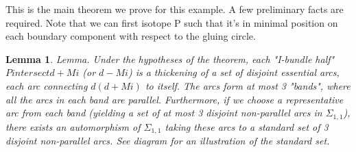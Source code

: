 \documentclass[12pt]{amsart}
\newtheorem{lemma}[theorem]{Lemma}
\theoremstyle{definition}
\newcommand{\Si}{\Sigma}
\begin{document}
This is the main theorem we prove for this example. A few preliminary facts are
required. Note that we can first isotope P such that it's in minimal position
on each boundary component with respect to the gluing circle.

\begin{lemma}

Lemma. Under the hypotheses of the theorem, each "I-bundle half" $P intersect
d+Mi$ (or $d-Mi$) is a thickening of a set of disjoint essential arcs, each arc
connecting $d(d+Mi)$ to itself. The arcs form at most 3 "bands", where all the
arcs in each band are parallel.  Furthermore, if we choose a representative arc
from each band (yielding a set of at most 3 disjoint non-parallel arcs in
$\Si_{1,1}$), there exists an automorphism of $\Si_{1,1}$ taking these arcs to a standard set
of 3 disjoint non-parallel arcs.  See diagram for an illustration of the
standard set.

\end{lemma}
\end{document}
